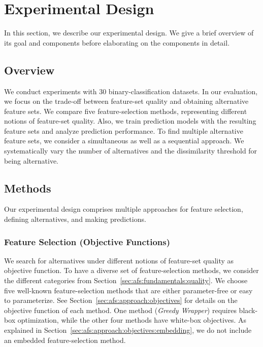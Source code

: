 \documentclass{article}
\theoremstyle{definition}
\begin{document}
\section{Experimental Design}
\label{sec:afs:experimental-design}

In this section, we describe our experimental design.
We give a brief overview of its goal and components before elaborating on the components in detail.

\subsection{Overview}
\label{sec:afs:experimental-design:overview}

We conduct experiments with 30 binary-classification datasets.
In our evaluation, we focus on the trade-off between feature-set quality and obtaining alternative feature sets.
We compare five feature-selection methods, representing different notions of feature-set quality.
Also, we train prediction models with the resulting feature sets and analyze prediction performance.
To find multiple alternative feature sets, we consider a simultaneous as well as a sequential approach.
We systematically vary the number of alternatives and the dissimilarity threshold for being alternative.

\subsection{Methods}
\label{sec:afs:experimental-design:approaches}

Our experimental design comprises multiple approaches for feature selection, defining alternatives, and making predictions.

\subsubsection{Feature Selection (Objective Functions)}
\label{sec:afs:experimental-design:approaches:feature-selection}

We search for alternatives under different notions of feature-set quality as objective function.
To have a diverse set of feature-selection methods, we consider the different categories from Section~\ref{sec:afs:fundamentals:quality}.
We choose five well-known feature-selection methods that are either parameter-free or easy to parameterize.
See Section~\ref{sec:afs:approach:objectives} for details on the objective function of each method.
One method (\emph{Greedy Wrapper}) requires black-box optimization, while the other four methods have white-box objectives.
As explained in Section~\ref{sec:afs:approach:objectives:embedding}, we do not include an embedded feature-selection method.
\end{document}
